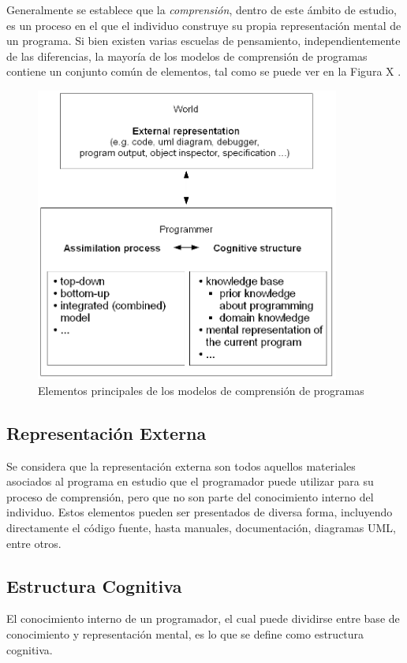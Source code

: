 Generalmente se establece que la \textit{comprensión}, dentro de este ámbito de estudio, es un
proceso en el que el individuo construye su propia representación mental de un programa.
Si bien existen varias escuelas de pensamiento, independientemente de las diferencias, la
mayoría de los modelos de comprensión de programas contiene un conjunto común de elementos,
tal como se puede ver en la Figura X \cite{SchulteClear10}.

\begin{figure}[H]
    \includegraphics[width=10cm]{program_comprehension/elements.png}
    \centering
    \caption{Elementos principales de los modelos de comprensión de programas}
\end{figure}

\subsection{Representación Externa}
Se considera que la representación externa son todos aquellos materiales asociados al programa
en estudio que el programador puede utilizar para su proceso de comprensión, pero que no son 
parte del conocimiento interno del individuo.
Estos elementos pueden ser presentados de diversa forma, incluyendo directamente el código fuente,
hasta manuales, documentación, diagramas UML, entre otros.

\subsection{Estructura Cognitiva}
El conocimiento interno de un programador, el cual puede dividirse entre base de conocimiento
y representación mental, es lo que se define como estructura cognitiva.

